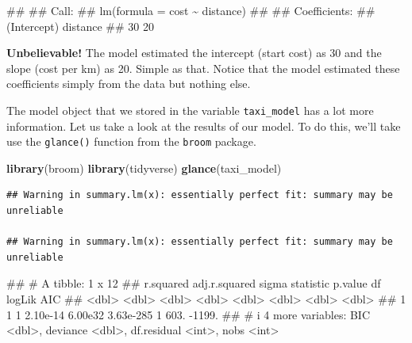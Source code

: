 \documentclass[
]{book}
\newenvironment{Shaded}{\begin{snugshade}}{\end{snugshade}}
\newcommand{\FunctionTok}[1]{\textcolor[rgb]{0.13,0.29,0.53}{\textbf{#1}}}
\newcommand{\NormalTok}[1]{#1}
\begin{document}
\begin{Shaded}
\begin{Highlighting}[]
\NormalTok{\#\# }
\NormalTok{\#\# Call:}
\NormalTok{\#\# lm(formula = cost \textasciitilde{} distance)}
\NormalTok{\#\# }
\NormalTok{\#\# Coefficients:}
\NormalTok{\#\# (Intercept)     distance  }
\NormalTok{\#\#          30           20}
\end{Highlighting}
\end{Shaded}

\textbf{Unbelievable!} The model estimated the intercept (start cost) as 30 and the slope (cost per km) as 20. Simple as that. Notice that the model estimated these coefficients simply from the data but nothing else.

The model object that we stored in the variable \texttt{taxi\_model} has a lot more information. Let us take a look at the results of our model. To do this, we'll take use the \texttt{glance()} function from the \texttt{broom} package.

\begin{Shaded}
\begin{Highlighting}[]
\FunctionTok{library}\NormalTok{(broom)}
\FunctionTok{library}\NormalTok{(tidyverse)}
\FunctionTok{glance}\NormalTok{(taxi\_model)}
\end{Highlighting}
\end{Shaded}

\begin{verbatim}
## Warning in summary.lm(x): essentially perfect fit: summary may be unreliable

## Warning in summary.lm(x): essentially perfect fit: summary may be unreliable
\end{verbatim}

\begin{Shaded}
\begin{Highlighting}[]
\NormalTok{\#\# \# A tibble: 1 x 12}
\NormalTok{\#\#   r.squared adj.r.squared    sigma statistic   p.value    df logLik    AIC}
\NormalTok{\#\#       \textless{}dbl\textgreater{}         \textless{}dbl\textgreater{}    \textless{}dbl\textgreater{}     \textless{}dbl\textgreater{}     \textless{}dbl\textgreater{} \textless{}dbl\textgreater{}  \textless{}dbl\textgreater{}  \textless{}dbl\textgreater{}}
\NormalTok{\#\# 1         1             1 2.10e{-}14   6.00e32 3.63e{-}285     1   603. {-}1199.}
\NormalTok{\#\# \# i 4 more variables: BIC \textless{}dbl\textgreater{}, deviance \textless{}dbl\textgreater{}, df.residual \textless{}int\textgreater{}, nobs \textless{}int\textgreater{}}
\end{Highlighting}
\end{Shaded}
\end{document}
